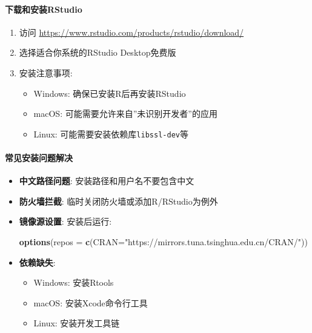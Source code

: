 \documentclass[
]{book}
\newenvironment{Shaded}{\begin{snugshade}}{\end{snugshade}}
\newcommand{\AttributeTok}[1]{\textcolor[rgb]{0.13,0.29,0.53}{#1}}
\newcommand{\FunctionTok}[1]{\textcolor[rgb]{0.13,0.29,0.53}{\textbf{#1}}}
\newcommand{\NormalTok}[1]{#1}
\newcommand{\StringTok}[1]{\textcolor[rgb]{0.31,0.60,0.02}{#1}}
\providecommand{\tightlist}{%
  \setlength{\itemsep}{0pt}\setlength{\parskip}{0pt}}
\begin{document}
\hypertarget{ux4e0bux8f7dux548cux5b89ux88c5rstudio}{%
\paragraph{下载和安装RStudio}\label{ux4e0bux8f7dux548cux5b89ux88c5rstudio}}

\begin{enumerate}
\def\labelenumi{\arabic{enumi}.}
\tightlist
\item
  访问 \url{https://www.rstudio.com/products/rstudio/download/}
\item
  选择适合你系统的RStudio Desktop免费版
\item
  安装注意事项:

  \begin{itemize}
  \tightlist
  \item
    Windows: 确保已安装R后再安装RStudio
  \item
    macOS: 可能需要允许来自''未识别开发者''的应用
  \item
    Linux: 可能需要安装依赖库\texttt{libssl-dev}等
  \end{itemize}
\end{enumerate}

\hypertarget{ux5e38ux89c1ux5b89ux88c5ux95eeux9898ux89e3ux51b3}{%
\paragraph{常见安装问题解决}\label{ux5e38ux89c1ux5b89ux88c5ux95eeux9898ux89e3ux51b3}}

\begin{itemize}
\item
  \textbf{中文路径问题}: 安装路径和用户名不要包含中文
\item
  \textbf{防火墙拦截}: 临时关闭防火墙或添加R/RStudio为例外
\item
  \textbf{镜像源设置}: 安装后运行:

\begin{Shaded}
\begin{Highlighting}[]
\FunctionTok{options}\NormalTok{(}\AttributeTok{repos =} \FunctionTok{c}\NormalTok{(}\AttributeTok{CRAN=}\StringTok{"https://mirrors.tuna.tsinghua.edu.cn/CRAN/"}\NormalTok{))}
\end{Highlighting}
\end{Shaded}
\item
  \textbf{依赖缺失}:

  \begin{itemize}
  \tightlist
  \item
    Windows: 安装Rtools
  \item
    macOS: 安装Xcode命令行工具
  \item
    Linux: 安装开发工具链
  \end{itemize}
\end{itemize}
\end{document}
